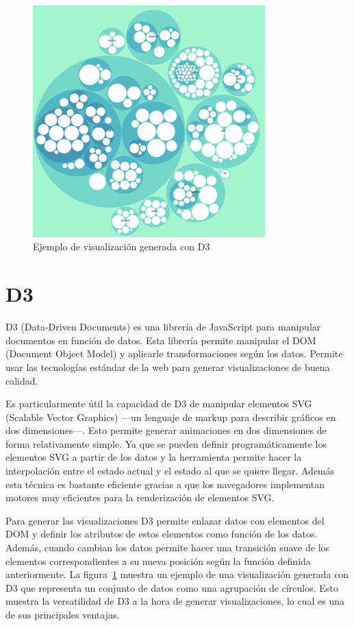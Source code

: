 \begin{figure}[H]
    \centering
    \includegraphics[width=0.8\textwidth]{imagenes/d3/ejemplo.png}
    \caption{Ejemplo de visualización generada con D3}
    \label{fig:d3-ejemplo}
\end{figure}

\section{D3}

D3 (Data-Driven Documents) es una librería de JavaScript para manipular documentos en función de datos. Esta librería permite manipular el DOM (Document Object Model) y aplicarle transformaciones según los datos. Permite usar las tecnologías estándar de la web para generar visualizaciones de buena calidad.

Es particularmente útil la capacidad de D3 de manipular elementos SVG (Scalable Vector Graphics) ---un lenguaje de markup para describir gráficos en dos dimensiones---. Esto permite generar animaciones en dos dimensiones de forma relativamente simple. Ya que se pueden definir programáticamente los elementos SVG a partir de los datos y la herramienta permite hacer la interpolación entre el estado actual y el estado al que se quiere llegar. Además esta técnica es bastante eficiente gracias a que los navegadores implementan motores muy eficientes para la renderización de elementos SVG.

Para generar las visualizaciones D3 permite enlazar datos con elementos del DOM y definir los atributos de estos elementos como función de los datos. Además, cuando cambian los datos permite hacer una transición suave de los elementos correspondientes a su nueva posición según la función definida anteriormente. La figura~\ref{fig:d3-ejemplo} muestra un ejemplo de una visualización generada con D3 que representa un conjunto de datos como una agrupación de círculos. Esto muestra la versatilidad de D3 a la hora de generar visualizaciones, lo cual es una de sus principales ventajas.

